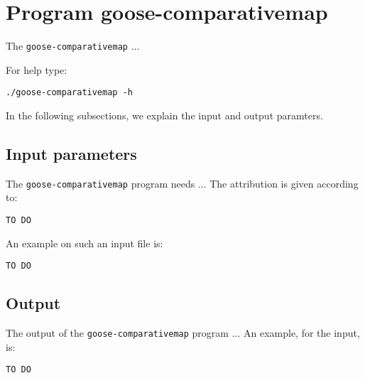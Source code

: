 \section{Program goose-comparativemap}
The \texttt{goose-comparativemap} ...

For help type:
\begin{lstlisting}
./goose-comparativemap -h
\end{lstlisting}
In the following subsections, we explain the input and output paramters.

\subsection*{Input parameters}

The \texttt{goose-comparativemap} program needs ...
The attribution is given according to:
\begin{lstlisting}
TO DO
\end{lstlisting}

An example on such an input file is:
\begin{lstlisting}
TO DO
\end{lstlisting}

\subsection*{Output}
The output of the \texttt{goose-comparativemap} program ...
An example, for the input, is:
\begin{lstlisting}
TO DO
\end{lstlisting}